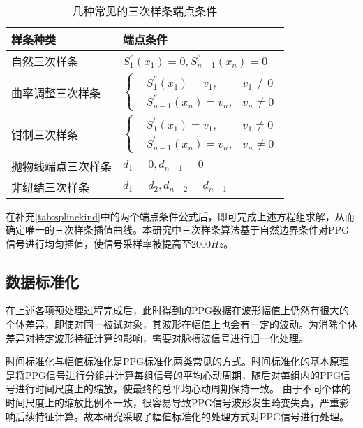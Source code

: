 \begin{table}[htbp]
    \centering
    \caption{\label{tab:splinekind}几种常见的三次样条端点条件}
    \begin{tabularx}{\linewidth}{X<{\centering}X<{\centering}}
        \toprule 
        \textbf{样条种类}&\textbf{端点条件}\\
        \midrule 
        自然三次样条&
        $
            S_{1}^{''}(x_{1})=0,
            S_{n-1}^{''}(x_{n})=0
        $
        \\
        曲率调整三次样条&
        $\left \{
        \begin{aligned}
            &S_{1}^{''}(x_{1})=v_1,&v_{1}\neq0\\
            &S_{n-1}^{''}(x_{n})=v_n,&v_{n}\neq0
        \end{aligned}
        \right.
        $
        \\
        钳制三次样条&
        $\left \{
        \begin{aligned}
            &S_{1}^{'}(x_{1})=v_1,&v_{1}\neq0\\
            &S_{n-1}^{'}(x_{n})=v_n,&v_{n}\neq0
        \end{aligned}
        \right.
        $
        \\
        抛物线端点三次样条&
        $
            d_1=0,d_{n-1}=0
        $
        \\
        非纽结三次样条&
        $
            d_1=d_2, d_{n-2}=d_{n-1}
        $
        \\
        \bottomrule
    \end{tabularx}
\end{table}

在补充\autoref{tab:splinekind}中的两个端点条件公式后，即可完成上述方程组求解，从而确定唯一的三次样条插值曲线。本研究中三次样条算法基于自然边界条件对PPG信号进行均匀插值\cite{ttk2021}，使信号采样率被提高至2000$Hz$。
\subsection{数据标准化}
在上述各项预处理过程完成后，此时得到的PPG数据在波形幅值上仍然有很大的个体差异，即使对同一被试对象，其波形在幅值上也会有一定的波动。为消除个体差异对特定波形特征计算的影响，需要对脉搏波信号进行归一化处理。

时间标准化与幅值标准化是PPG标准化两类常见的方式\cite{mmt}。时间标准化的基本原理是将PPG信号进行分组并计算每组信号的平均心动周期，随后对每组内的PPG信号进行时间尺度上的缩放，使最终的总平均心动周期保持一致。
由于不同个体的时间尺度上的缩放比例不一致，很容易导致PPG信号波形发生畸变失真，严重影响后续特征计算。故本研究采取了幅值标准化的处理方式对PPG信号进行处理。

